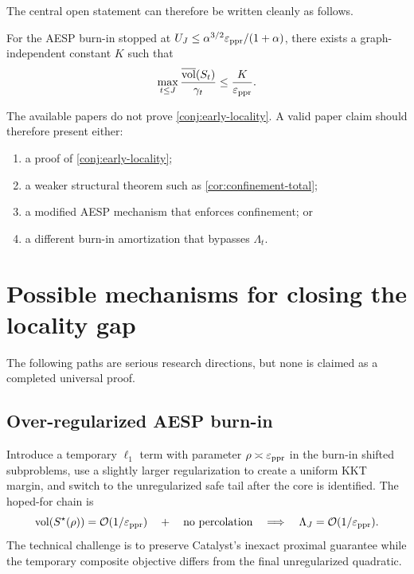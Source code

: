 The central open statement can therefore be written cleanly as follows.

\begin{conjecture}
\label{conj:early-locality}
For the AESP burn-in stopped at
$U_J\leq\alpha^{3/2}\varepsilon_{\mathrm{ppr}}/(1+\alpha)$, there exists a graph-independent constant
$K$ such that
\begin{equation}
  \max_{t\leq J}
  \frac{\overline{\operatorname{vol}}(S_t)}{\gamma_t}
  \leq\frac{K}{\varepsilon_{\mathrm{ppr}}}.
  \label{eq:early-locality-conjecture}
\end{equation}
\end{conjecture}

The available papers do not prove \cref{conj:early-locality}.  A valid paper
claim should therefore present either:
\begin{enumerate}[label=(\alph*),leftmargin=2em]
  \item a proof of \cref{conj:early-locality};
  \item a weaker structural theorem such as
        \cref{cor:confinement-total};
  \item a modified AESP mechanism that enforces confinement; or
  \item a different burn-in amortization that bypasses $\Lambda_t$.
\end{enumerate}

\section{Possible mechanisms for closing the locality gap}
\label{sec:paths}

The following paths are serious research directions, but none is claimed as a
completed universal proof.

\subsection{Over-regularized AESP burn-in}

Introduce a temporary $\ell_1$ term with parameter $\rho\asymp\varepsilon_{\mathrm{ppr}}$ in the
burn-in shifted subproblems, use a slightly larger regularization to create a
uniform KKT margin, and switch to the unregularized safe tail after the core is
identified.  The hoped-for chain is
\[
  \operatorname{vol}(S^\star(\rho))=\mathcal{O}(1/\varepsilon_{\mathrm{ppr}})
  \quad+\quad
  \text{no percolation}
  \quad\Longrightarrow\quad
  \Lambda_J=\mathcal{O}(1/\varepsilon_{\mathrm{ppr}}).
\]
The technical challenge is to preserve Catalyst's inexact proximal guarantee
while the temporary composite objective differs from the final unregularized
quadratic.

